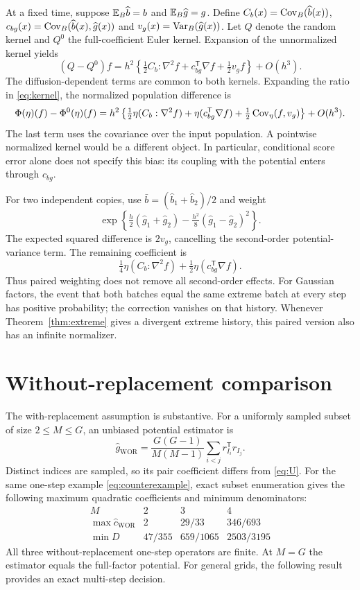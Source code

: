 At a fixed time, suppose $\mathbb E_B\widehat b=b$ and $\mathbb E_B\widehat g=g$. Define $C_b(x)=\operatorname{Cov}_B(\widehat b(x))$, $c_{bg}(x)=\operatorname{Cov}_B(\widehat b(x),\widehat g(x))$ and $v_g(x)=\operatorname{Var}_B(\widehat g(x))$. Let $Q$ denote the random kernel and $Q^0$ the full-coefficient Euler kernel. Expansion of the unnormalized kernel yields
\[
 (Q-Q^0)f=h^2\left\{\tfrac12 C_b:\nabla^2 f+c_{bg}^{\mathsf T}\nabla f+\tfrac12v_g f\right\}+O(h^3).
\]
The diffusion-dependent terms are common to both kernels. Expanding the ratio in \eqref{eq:kernel}, the normalized population difference is
\begin{equation}\label{eq:local-bias}
 \Phi(\eta)(f)-\Phi^0(\eta)(f)
 =h^2\left\{\tfrac12\eta(C_b:\nabla^2f)+\eta(c_{bg}^{\mathsf T}\nabla f)
 +\tfrac12\operatorname{Cov}_\eta(f,v_g)\right\}+O(h^3).
\end{equation}
The last term uses the covariance over the input population. A pointwise normalized kernel would be a different object. In particular, conditional score error alone does not specify this bias: its coupling with the potential enters through $c_{bg}$.

For two independent copies, use $\bar b=(\widehat b_1+\widehat b_2)/2$ and weight
\[
 \exp\left\{\tfrac h2(\widehat g_1+\widehat g_2)
 -\tfrac{h^2}{8}(\widehat g_1-\widehat g_2)^2\right\}.
\]
The expected squared difference is $2v_g$, cancelling the second-order potential-variance term. The remaining coefficient is
\[
 \tfrac14\eta(C_b:\nabla^2f)+\tfrac12\eta(c_{bg}^{\mathsf T}\nabla f).
\]
Thus paired weighting does not remove all second-order effects. For Gaussian factors, the event that both batches equal the same extreme batch at every step has positive probability; the correction vanishes on that history. Whenever Theorem~\ref{thm:extreme} gives a divergent extreme history, this paired version also has an infinite normalizer.

\section{Without-replacement comparison}\label{app:without-replacement}
The with-replacement assumption is substantive. For a uniformly sampled subset of size $2\le M\le G$, an unbiased potential estimator is
\[
 \widehat g_{\mathrm{WOR}}=\frac{G(G-1)}{M(M-1)}\sum_{i<j}r_{I_i}^{\mathsf T}r_{I_j}.
\]
Distinct indices are sampled, so its pair coefficient differs from \eqref{eq:U}. For the same one-step example \eqref{eq:counterexample}, exact subset enumeration gives the following maximum quadratic coefficients and minimum denominators:
\[
\begin{array}{c|ccc}
 M & 2 & 3 & 4\\ \hline
 \max\widehat c_{\mathrm{WOR}} & 2 & 29/33 & 346/693\\
 \min D & 47/355 & 659/1065 & 2503/3195
\end{array}
\]
All three without-replacement one-step operators are finite. At $M=G$ the estimator equals the full-factor potential. For general grids, the following result provides an exact multi-step decision.

